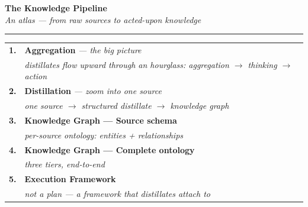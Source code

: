 \documentclass[11pt]{article}
\begin{document}
\thispagestyle{empty}
\vspace*{3cm}
\begin{center}
{\Huge\bfseries\color{ink} The Knowledge Pipeline}\\[14pt]
{\Large\itshape\color{soft} An atlas — from raw sources to acted-upon knowledge}
\end{center}

\vspace{1.5cm}
\begin{center}{\color{soft2}\rule{0.7\textwidth}{0.4pt}}\end{center}
\vspace{1.5cm}

\begin{center}
\begin{tabular}{r@{\quad}l}
\textcolor{accent}{\large\textbf{1.}} & \textbf{Aggregation} \emph{— the big picture}\\[-2pt]
& {\small\color{soft}\itshape distillates flow upward through an hourglass: \emph{aggregation $\to$ thinking $\to$ action}}\\[10pt]

\textcolor{accent}{\large\textbf{2.}} & \textbf{Distillation} \emph{— zoom into one source}\\[-2pt]
& {\small\color{soft}\itshape one source $\to$ structured distillate $\to$ knowledge graph}\\[10pt]

\textcolor{accent}{\large\textbf{3.}} & \textbf{Knowledge Graph — Source schema}\\[-2pt]
& {\small\color{soft}\itshape per-source ontology: entities + relationships}\\[10pt]

\textcolor{accent}{\large\textbf{4.}} & \textbf{Knowledge Graph — Complete ontology}\\[-2pt]
& {\small\color{soft}\itshape three tiers, end-to-end}\\[10pt]

\textcolor{accent}{\large\textbf{5.}} & \textbf{Execution Framework}\\[-2pt]
& {\small\color{soft}\itshape not a plan — a framework that distillates attach to}\\
\end{tabular}
\end{center}
\end{document}
